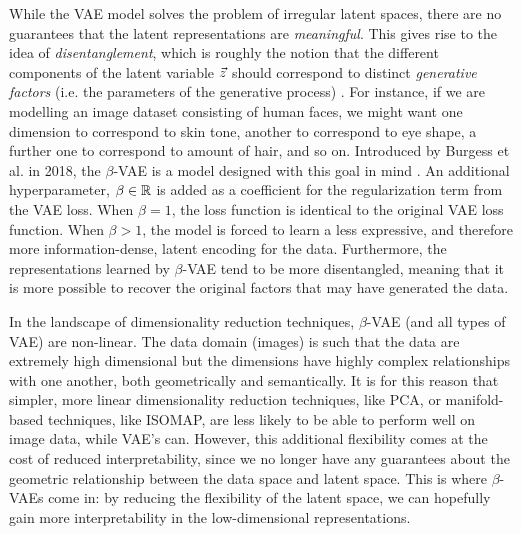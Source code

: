 While the VAE model solves the problem of irregular latent spaces, there are no guarantees that the latent representations are {\it meaningful}. This gives rise to the idea of {\it disentanglement}, which is roughly the notion that the different components of the latent variable $\vec{z}$ should correspond to distinct {\it generative factors} (i.e. the parameters of the generative process) \cite{bengio2012representation}. For instance, if we are modelling an image dataset consisting of human faces, we might want one dimension to correspond to skin tone, another to correspond to eye shape, a further one to correspond to amount of hair, and so on. Introduced by Burgess et al. in 2018, the $\beta$-VAE is a model designed with this goal in mind \cite{higgins2016beta}. An additional hyperparameter, $\beta \in \mathbb{R}$ is added as a coefficient for the regularization term from the VAE loss. When $\beta=1$, the loss function is identical to the original VAE loss function. When $\beta > 1$, the model is forced to learn a less expressive, and therefore more information-dense, latent encoding for the data. Furthermore, the representations learned by $\beta$-VAE tend to be more disentangled, meaning that it is more possible to recover the original factors that may have generated the data.

In the landscape of dimensionality reduction techniques, $\beta$-VAE (and all types of VAE) are non-linear. The data domain (images) is such that the data are extremely high dimensional but the dimensions have highly complex relationships with one another, both geometrically and semantically. It is for this reason that simpler, more linear dimensionality reduction techniques, like PCA, or manifold-based techniques, like ISOMAP, are less likely to be able to perform well on image data, while VAE's can. However, this additional flexibility comes at the cost of reduced interpretability, since we no longer have any guarantees about the geometric relationship between the data space and latent space. This is where $\beta$-VAEs come in: by reducing the flexibility of the latent space, we can hopefully gain more interpretability in the low-dimensional representations.